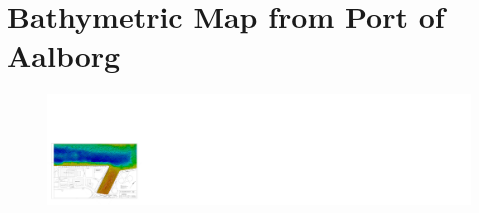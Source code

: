 \chapter{Bathymetric Map from Port of Aalborg} \label{app:bathymetricMapPortOfAalborg}
\begin{figure}[H]   %
  \includegraphics[angle=90, origin=c, width=.8\textwidth]{figures/bathymetricMapPortOfAalborg.pdf}
\end{figure}
